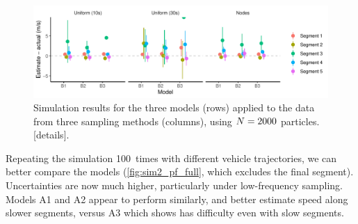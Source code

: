 \begin{knitrout}\small
{}\color{fgcolor}\begin{figure}
\includegraphics[width=\linewidth]{figure/sim2_pf-1} \caption[Simulation results for the three models (rows) applied to the data from three sampling methods (columns), using $\Np=2000$ particles]{Simulation results for the three models (rows) applied to the data from three sampling methods (columns), using $\Np=2000$ particles. [details].}\label{fig:sim2_pf}
\end{figure}


\end{knitrout}


Repeating the simulation 100~times with different vehicle trajectories, we can better compare the models (\cref{fig:sim2_pf_full}, which excludes the final segment). Uncertainties are now much higher, particularly under low-frequency sampling. Models A1 and A2 appear to perform similarly, and better estimate speed along slower segments, versus A3 which shows has difficulty even with slow segments.

